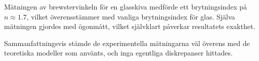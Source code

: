 \documentclass[a4paper]{article}
\begin{document}

Mätningen av brewstervinkeln för en glasskiva medförde ett brytningsindex på $n \approx 1.7$, vilket överensstämmer med vanliga brytningsindex för glas. Själva mätningen gjordes med ögonmått, vilket självklart påverkar resultatets exakthet.


Sammanfattningsvis stämde de experimentella mätningarna väl överens med de teoretiska modeller som använts, och inga egentliga diskrepanser hittades.

 {}
 
\end{document}
